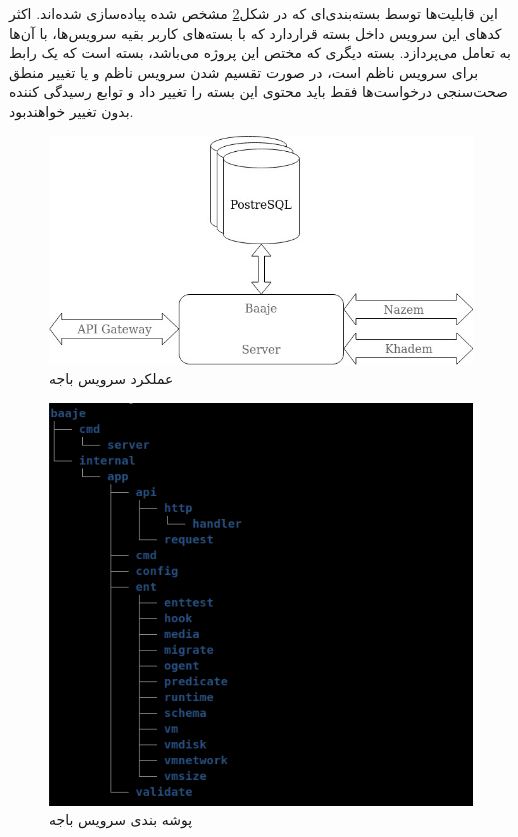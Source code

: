 این قابلیت‌ها توسط بسته‌بندی‌ای که در شکل\ref{fig:30bird-baaje-dir} مشخص شده پیاده‌سازی شده‌اند. اکثر کد‌های این سرویس داخل بسته  قرار‌دارد که با بسته‌های کاربر بقیه سرویس‌ها، با آن‌ها به تعامل می‌پردازد.
بسته دیگری که مختص این پروژه می‌باشد، بسته  است که یک رابط برای سرویس ناظم است، در صورت تقسیم شدن سرویس ناظم  و یا تغییر منطق صحت‌سنجی درخواست‌ها فقط باید محتوی این بسته را تغییر داد و توابع رسیدگی کننده بدون تغییر خواهندبود.
\begin{figure}
	\centering
	\includegraphics[scale=0.5]{figures/30bird-baaje.jpg}
	\caption{عملکرد سرویس باجه}
	\label{fig:30bird-baaje}
\end{figure}

\begin{figure}
	\vspace{1cm}
	\centering
	\includegraphics[scale=0.7]{figures/baaje-dir.png}
	\caption{پوشه بندی سرویس باجه}
	\label{fig:30bird-baaje-dir}
\end{figure}


